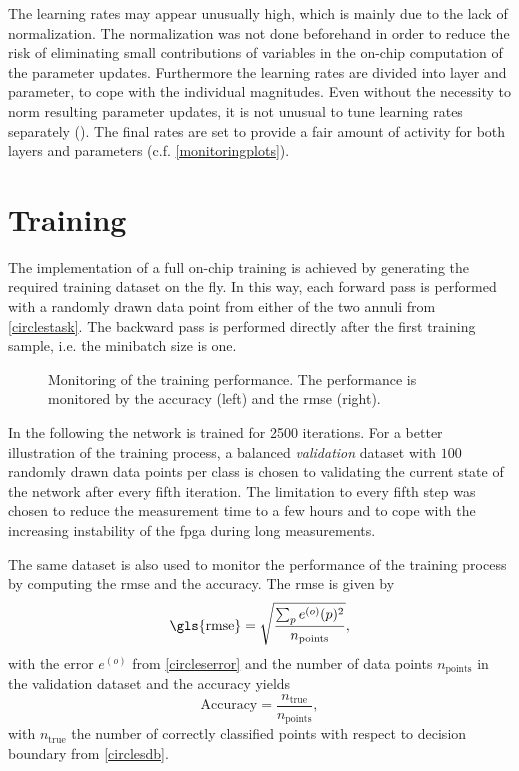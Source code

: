 The learning rates may appear unusually high, which is mainly due to the lack of normalization. The normalization was not done beforehand in order to reduce the risk of eliminating small contributions of variables in the on-chip computation of the parameter updates. Furthermore the learning rates are divided into layer and parameter, to cope with the individual magnitudes. Even without the necessity to norm resulting parameter updates, it is not unusual to tune learning rates separately (\citealp{Goodfellow-et-al-2016}). The final rates are set to provide a fair amount of activity for both layers and parameters (c.f. \cref{monitoringplots}).

\section{Training}
The implementation of a full on-chip training is achieved by generating the required training dataset on the fly. In this way, each forward pass is performed with a randomly drawn data point from either of the two annuli from \cref{circlestask}. The backward pass is performed directly after the first training sample, i.e. the minibatch size is one.

\begin{figure}
	\begin{center}
		
	\end{center}
	\caption[Monitoring of the training performance.]{Monitoring of the training performance. The performance is monitored by the accuracy (left) and the \acrfull{rmse} (right).}
	\label{circles_acc}
\end{figure}

In the following the network is trained for 2500 iterations. For a better illustration of the training process, a balanced \emph{validation} dataset with $100$ randomly drawn data points per class is chosen to validating the current state of the network after every fifth iteration. The limitation to every fifth step was chosen to reduce the measurement time to a few hours and to cope with the increasing instability of the \gls{fpga} during long measurements.

The same dataset is also used to monitor the performance of the training process by computing the \gls{rmse} and the accuracy. The \gls{rmse} is given by
\begin{equation}
\text{\gls{rmse}} = \sqrt{\frac{\sum_p e^{(o)}(p)^2}{n_\text{points}}},
\end{equation}
with the error $e^{(o)}$ from \cref{circleserror} and the number of data points $n_\text{points}$ in the validation dataset and the accuracy yields
\begin{equation}
\text{Accuracy} = \frac{n_\text{true}}{n_\text{points}},
\end{equation}
with $n_\text{true}$ the number of correctly classified points with respect to decision boundary from \cref{circlesdb}.

